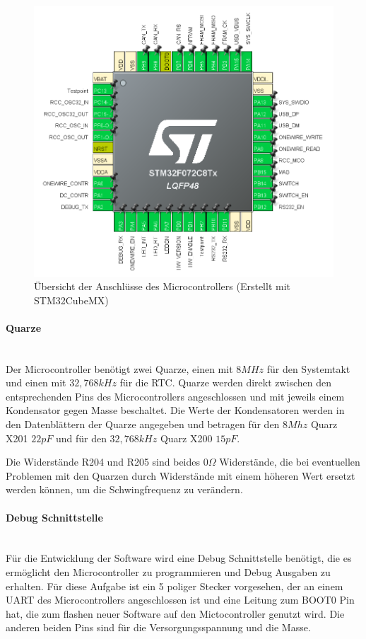 \begin{figure}[H]
    \centering
    \includegraphics[width=1\textwidth]{resources/images/STMCUBE.png}
    \caption[Übersicht der Anschlüsse des Microcontrollers]{Übersicht der Anschlüsse des Microcontrollers
        (Erstellt mit STM32CubeMX\cite{stmcube})}
    \label{fig:uC_uebersicht}
\end{figure}

\paragraph{Quarze}\mbox{}\\
Der Microcontroller benötigt zwei Quarze, einen mit \(8MHz\) für den Systemtakt und einen mit \(32,768kHz\) für die \ac{RTC}.
Quarze werden direkt zwischen den entsprechenden Pins des Microcontrollers angeschlossen und mit jeweils einem Kondensator
gegen Masse beschaltet. Die Werte der Kondensatoren werden in den Datenblättern der Quarze angegeben und betragen für den
\(8Mhz\) Quarz X201 \(22pF\) und für den \(32,768kHz\) Quarz X200 \(15pF\).

Die Widerstände R204 und R205 sind beides \(0\Omega\) Widerstände, die bei eventuellen Problemen mit den Quarzen durch
Widerstände mit einem höheren Wert ersetzt werden können, um die Schwingfrequenz zu verändern.

\paragraph{Debug Schnittstelle}\mbox{}\\
Für die Entwicklung der Software wird eine Debug Schnittstelle benötigt, die es ermöglicht den Microcontroller zu programmieren
und Debug Ausgaben zu erhalten. Für diese Aufgabe ist ein 5 poliger Stecker vorgesehen, der an einem \ac{UART} des Microcontrollers
angeschlossen ist und eine Leitung zum BOOT0 Pin hat, die zum flashen neuer Software auf den Mictocontroller genutzt wird.
Die anderen beiden Pins sind für die Versorgungsspannung und die Masse.

